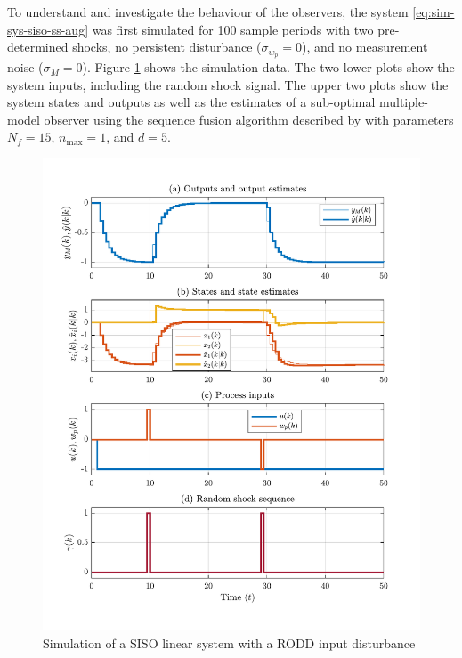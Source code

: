 To understand and investigate the behaviour of the observers, the system \eqref{eq:sim-sys-siso-ss-aug} was first simulated for 100 sample periods with two pre-determined shocks, no persistent disturbance ($\sigma_{w_p}=0$), and no measurement noise ($\sigma_M=0$). Figure \ref{fig:rod-obs-sim-test-ioplot-SF95} shows the simulation data. The two lower plots show the system inputs, including the random shock signal. The upper two plots show the system states and outputs as well as the estimates of a sub-optimal multiple-model observer using the sequence fusion algorithm described by \cite{robertson_detection_1995} with parameters $N_f=15$, $n_\text{max}=1$, and $d=5$.
\begin{figure}[htp]
	\centering
	\includegraphics[width=13cm]{images/rod_MKF_SF_test_sim_MKF_SF95_ioplot.pdf}
	\caption{Simulation of a SISO linear system with a \gls{RODD} input disturbance}
	\label{fig:rod-obs-sim-test-ioplot-SF95}
\end{figure}

